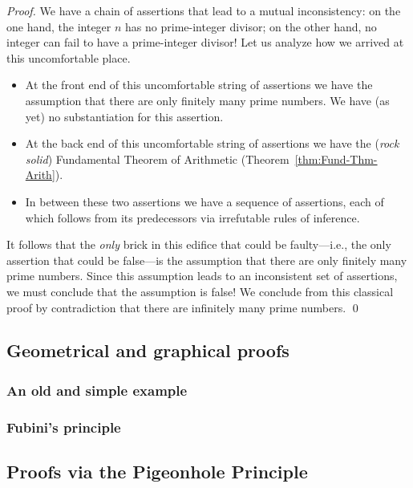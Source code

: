 \begin{proof}
We have a chain of assertions that lead to a mutual inconsistency: on
the one hand, the integer $n$ has no prime-integer divisor; on the
other hand, no integer can fail to have a prime-integer divisor!  Let
us analyze how we arrived at this uncomfortable place.
\begin{itemize}
\item
At the front end of this uncomfortable string of assertions we have
the assumption that there are only finitely many prime numbers.  We
have (as yet) no substantiation for this assertion.
\item
At the back end of this uncomfortable string of assertions we have
the ({\em rock solid}) Fundamental Theorem of Arithmetic
(Theorem~\ref{thm:Fund-Thm-Arith}).
\item
In between these two assertions we have a sequence of assertions, each
of which follows from its predecessors via irrefutable rules of
inference.
\end{itemize}
It follows that the {\em only} brick in this edifice that could be
faulty---i.e., the only assertion that could be false---is the
assumption that there are only finitely many prime numbers.  Since
this assumption leads to an inconsistent set of assertions, we must
conclude that the assumption is false!  We conclude from this
classical proof by contradiction that there are infinitely many prime
numbers.  \qed
\end{proof}



\subsection{Geometrical and graphical proofs}
\label{sec:unconventionalproofs}

\subsubsection{An old and simple example}

\subsubsection{Fubini's principle}
\label{sec:Fubini}

\cite{Fubini}


\subsection{Proofs via the Pigeonhole Principle}
\label{sec:pigeonhole}

